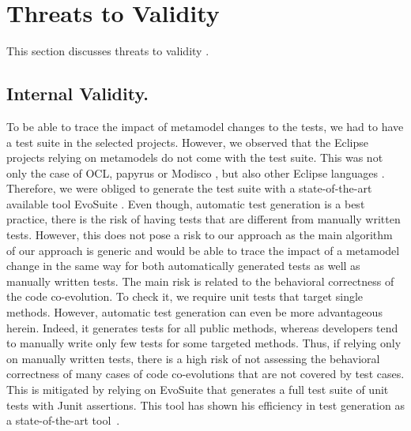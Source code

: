 \section{Threats to Validity}\label{threat}
\noindent This section discusses threats to validity \cite{wohlin2012experimentation}.

\subsection{Internal Validity.}
To be able to trace the impact of metamodel changes to the tests, we had to have a test suite in the selected projects. However, we observed that the Eclipse projects relying on metamodels do not come with the test suite. This was not only the case of OCL\cite{MDTOCL}, papyrus \cite{MDTPapyrus} or Modisco \cite{MDTModisco}, but also other Eclipse languages \cite{UML241,BPMN2}. Therefore, we were obliged to generate the test suite with a state-of-the-art available tool EvoSuite \cite{fraser2011evosuite}. 
Even though, automatic test generation is a best practice, there is the risk of having tests that are different from manually written tests. 
However, this does not pose a risk to our approach as the main algorithm of our approach is generic and would be able to trace the impact of a metamodel change in the same way for both automatically generated tests as well as manually written tests.  
The main risk is related to the behavioral correctness of the code co-evolution. To check it, we require unit tests that target single methods. 
However, automatic test generation can even be more advantageous herein. Indeed, it generates tests for all public methods, whereas developers tend to manually write only few tests for some targeted methods. Thus, if relying only on manually written tests, there is a high risk of not assessing the behavioral correctness of many cases of code co-evolutions that are not covered by test cases. 
This is mitigated by relying on EvoSuite that generates a full test suite of unit tests with Junit assertions. This tool has shown his efficiency in test generation as a state-of-the-art tool~\cite{DANGLOT2019110398,https://doi.org/10.1002/stvr.1601}. 

